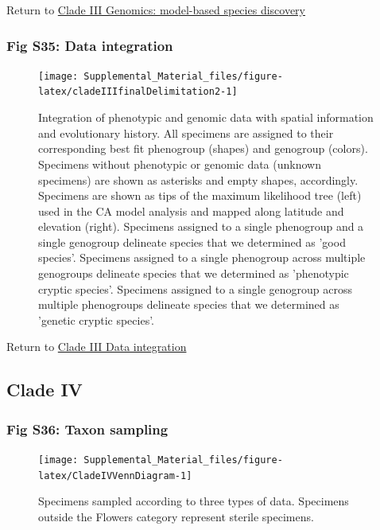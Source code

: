 \documentclass[
  11pt,
]{article}
\begin{document}
Return to \protect\hyperlink{model-based-species-discovery-5}{Clade III Genomics: model-based species discovery}
\pagebreak

\hypertarget{fig-s35-data-integration}{%
\subsubsection{Fig S35: Data integration}\label{fig-s35-data-integration}}

\begin{figure}
\texttt{[image: Supplemental\_Material\_files/figure-latex/cladeIIIfinalDelimitation2-1]} \caption{Integration of phenotypic and genomic data with spatial information and evolutionary history. All specimens are assigned to their corresponding best fit phenogroup (shapes) and genogroup (colors). Specimens without phenotypic or genomic data (unknown specimens) are shown as asterisks and empty shapes, accordingly. Specimens are shown as tips of the maximum likelihood tree (left) used in the CA model analysis and mapped along latitude and elevation (right). Specimens assigned to a single phenogroup and a single genogroup delineate species that we determined as 'good species'. Specimens assigned to a single phenogroup across multiple genogroups delineate species that we determined as 'phenotypic cryptic species'. Specimens assigned to a single genogroup across multiple phenogroups delineate species that we determined as 'genetic cryptic species'.}\label{fig:cladeIIIfinalDelimitation2}
\end{figure}

Return to \protect\hyperlink{data-integration-3}{Clade III Data integration}
\pagebreak

\hypertarget{clade-iv-2}{%
\subsection{Clade IV}\label{clade-iv-2}}

\hypertarget{fig-s36-taxon-sampling}{%
\subsubsection{Fig S36: Taxon sampling}\label{fig-s36-taxon-sampling}}

\begin{figure}

{\centering \texttt{[image: Supplemental\_Material\_files/figure-latex/CladeIVVennDiagram-1]} 

}

\caption{Specimens sampled according to three types of data. Specimens outside the Flowers category represent sterile specimens.}\label{fig:CladeIVVennDiagram}
\end{figure}
\end{document}

